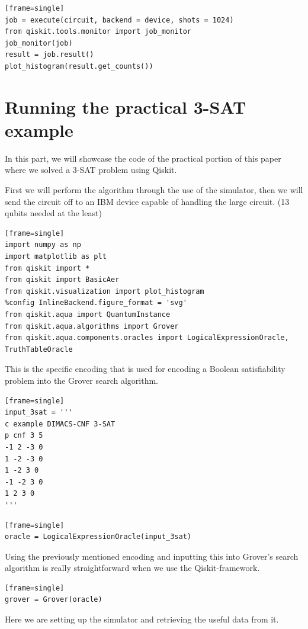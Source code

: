 \begin{verbatim}[frame=single]
job = execute(circuit, backend = device, shots = 1024)
from qiskit.tools.monitor import job_monitor
job_monitor(job)
result = job.result()
plot_histogram(result.get_counts())
\end{verbatim}

\section{Running the practical 3-SAT example}

In this part, we will showcase the code of the practical portion of this paper where we solved a 3-SAT problem using Qiskit.

First we will perform the algorithm through the use of the simulator, then we will send the circuit off to an IBM device capable of handling the large circuit. (13 qubits needed at the least)

\begin{verbatim}[frame=single]
import numpy as np
import matplotlib as plt
from qiskit import *
from qiskit import BasicAer
from qiskit.visualization import plot_histogram
%config InlineBackend.figure_format = 'svg'
from qiskit.aqua import QuantumInstance
from qiskit.aqua.algorithms import Grover
from qiskit.aqua.components.oracles import LogicalExpressionOracle, TruthTableOracle
\end{verbatim}

This is the specific encoding that is used for encoding a Boolean satisfiability problem into the Grover search algorithm.

\begin{verbatim}[frame=single]
input_3sat = '''
c example DIMACS-CNF 3-SAT
p cnf 3 5
-1 2 -3 0
1 -2 -3 0
1 -2 3 0
-1 -2 3 0
1 2 3 0
'''
\end{verbatim}

\begin{verbatim}[frame=single]
oracle = LogicalExpressionOracle(input_3sat)
\end{verbatim}

Using the previously mentioned encoding and inputting this into Grover's search algorithm is really straightforward when we use the Qiskit-framework.

\begin{verbatim}[frame=single]
grover = Grover(oracle)
\end{verbatim}

Here we are setting up the simulator and retrieving the useful data from it.

